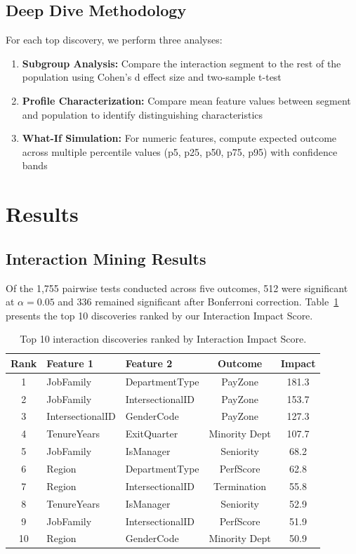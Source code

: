 \documentclass[twocolumn]{article}
\begin{document}
\subsection{Deep Dive Methodology}

For each top discovery, we perform three analyses:
\begin{enumerate}
    \item \textbf{Subgroup Analysis:} Compare the interaction segment to the rest of the population using Cohen's d effect size and two-sample t-test
    \item \textbf{Profile Characterization:} Compare mean feature values between segment and population to identify distinguishing characteristics
    \item \textbf{What-If Simulation:} For numeric features, compute expected outcome across multiple percentile values (p5, p25, p50, p75, p95) with confidence bands
\end{enumerate}

\section{Results}
\label{sec:results}

\subsection{Interaction Mining Results}

Of the 1,755 pairwise tests conducted across five outcomes, 512 were significant at $\alpha = 0.05$ and 336 remained significant after Bonferroni correction. Table~\ref{tab:top10} presents the top 10 discoveries ranked by our Interaction Impact Score.

\begin{table}[ht]
\centering
\caption{Top 10 interaction discoveries ranked by Interaction Impact Score.}
\label{tab:top10}
\small
\begin{tabular}{cllcc}
\hline
Rank & Feature 1 & Feature 2 & Outcome & Impact \\
\hline
1 & JobFamily & DepartmentType & PayZone & 181.3 \\
2 & JobFamily & IntersectionalID & PayZone & 153.7 \\
3 & IntersectionalID & GenderCode & PayZone & 127.3 \\
4 & TenureYears & ExitQuarter & Minority Dept & 107.7 \\
5 & JobFamily & IsManager & Seniority & 68.2 \\
6 & Region & DepartmentType & PerfScore & 62.8 \\
7 & Region & IntersectionalID & Termination & 55.8 \\
8 & TenureYears & IsManager & Seniority & 52.9 \\
9 & JobFamily & IntersectionalID & PerfScore & 51.9 \\
10 & Region & GenderCode & Minority Dept & 50.9 \\
\hline
\end{tabular}
\end{table}
\end{document}
